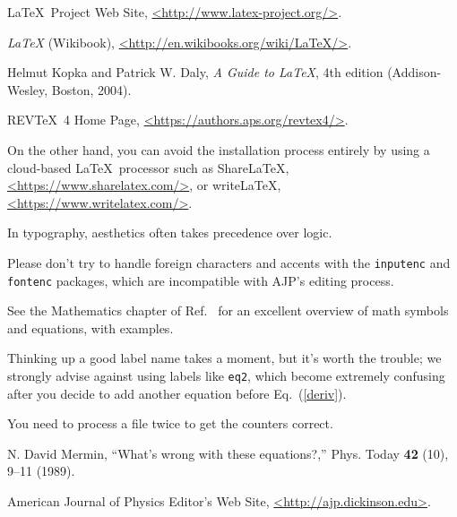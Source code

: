 \documentclass[prb,preprint]{revtex4-1}
\begin{document}
\begin{thebibliography}{99}

 \LaTeX\ Project Web Site, \url{<http://www.latex-project.org/>}.

 \textit{\LaTeX} (Wikibook), \url{<http://en.wikibooks.org/wiki/LaTeX/>}.

Helmut Kopka and Patrick W. Daly, \textit{A Guide to
\LaTeX}, 4th edition (Addison-Wesley, Boston, 2004).

 REV\TeX\ 4 Home Page, \url{<https://authors.aps.org/revtex4/>}.

 On the other hand, you can avoid the installation process
entirely by using a cloud-based \LaTeX\ processor such as ShareLaTeX,
\url{<https://www.sharelatex.com/>}, or write\LaTeX, \url{<https://www.writelatex.com/>}.

 In typography, aesthetics often takes precedence over logic.

 Please don't try to handle foreign characters 
and accents with the \texttt{inputenc} and \texttt{fontenc} packages, which 
are incompatible with AJP's editing process.

 See the Mathematics chapter of Ref.~
for an excellent overview of math symbols and equations, with examples.

 Thinking up a good label name takes a moment, but 
it's worth the trouble; we strongly advise against using labels like 
\texttt{eq2}, which become extremely confusing after you decide to add 
another equation before Eq.~(\ref{deriv}).

 You need to process a file twice to get the counters correct.

 N. David Mermin, ``What's wrong with these equations?,'' 
Phys. Today \textbf{42} (10), 9--11 (1989).  

 American Journal of Physics Editor's Web Site, 
\url{<http://ajp.dickinson.edu>}.


\end{thebibliography}
\end{document}
